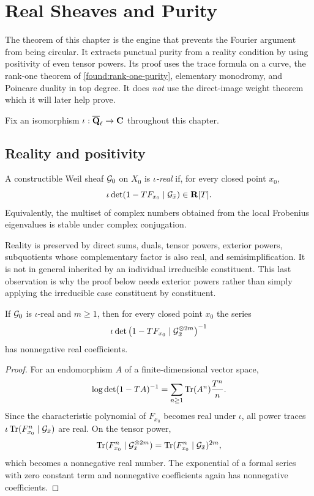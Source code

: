 \chapter{Real Sheaves and Purity}
\label{chap:real-sheaves}

The theorem of this chapter is the engine that prevents the Fourier
argument from being circular.  It extracts punctual purity from a
reality condition by using positivity of even tensor powers.  Its proof
uses the trace formula on a curve, the rank-one theorem of
\cref{found:rank-one-purity}, elementary monodromy, and Poincare duality
in top degree.  It does \emph{not} use the direct-image weight theorem
which it will later help prove.

Fix an isomorphism \(\iota:\overline{\mathbf Q}_\ell\to\mathbf C\) throughout this chapter.

\section{Reality and positivity}

\begin{definition}
\label{def:iota-real}
A constructible Weil sheaf \(\mathcal G_0\) on \(X_0\) is
\emph{\(\iota\)-real} if, for every closed point \(x_0\),
\[
  \iota\det(1-TF_{x_0}\mid\mathcal G_{\bar x})
  \in\mathbf R[T].
\]
Equivalently, the multiset of complex numbers obtained from the local
Frobenius eigenvalues is stable under complex conjugation.
\end{definition}

Reality is preserved by direct sums, duals, tensor powers, exterior
powers, subquotients whose complementary factor is also real, and
semisimplification.  It is not in general inherited by an individual
irreducible constituent.  This last observation is why the proof below
needs exterior powers rather than simply applying the irreducible case
constituent by constituent.

\begin{lemma}
\label{lem:positive-local-factors}
If \(\mathcal G_0\) is \(\iota\)-real and \(m\geq 1\), then for every closed
point \(x_0\) the series
\[
  \iota\det\left(1-TF_{x_0}\mid
  \mathcal G_{\bar x}^{\otimes 2m}\right)^{-1}
\]
has nonnegative real coefficients.
\end{lemma}

\begin{proof}
For an endomorphism \(A\) of a finite-dimensional vector space,
\[
  \log\det(1-TA)^{-1}
  =\sum_{n\geq1}\operatorname{Tr}(A^n)\frac{T^n}{n}.
\]
Since the characteristic polynomial of \(F_{x_0}\) becomes real under
\(\iota\), all power traces
\(\iota\operatorname{Tr}(F_{x_0}^n\mid\mathcal G_{\bar x})\) are real.  On the tensor power,
\[
  \operatorname{Tr}(F_{x_0}^n\mid\mathcal G_{\bar x}^{\otimes 2m})
  =\operatorname{Tr}(F_{x_0}^n\mid\mathcal G_{\bar x})^{2m},
\]
which becomes a nonnegative real number.  The exponential of a formal
series with zero constant term and nonnegative coefficients again has
nonnegative coefficients.
\end{proof}

